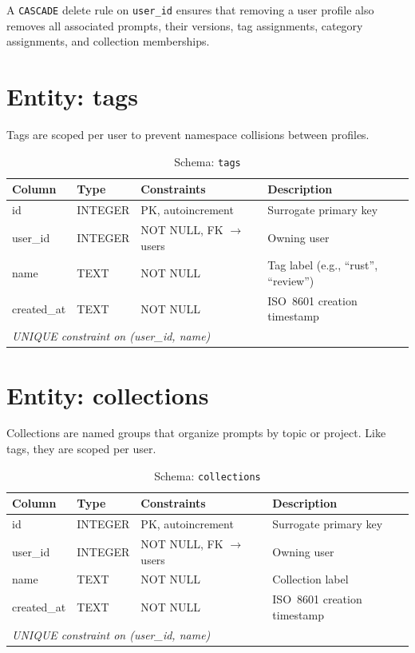 \documentclass[a4paper, 11pt, oneside]{report}
\begin{document}
A \texttt{CASCADE} delete rule on \texttt{user\_id} ensures that removing a
user profile also removes all associated prompts, their versions, tag
assignments, category assignments, and collection memberships.

\section{Entity: tags}
\label{sec:entity-tags}

Tags are scoped per user to prevent namespace collisions between profiles.

\begin{table}[H]
  \centering
  \caption{Schema: \texttt{tags}}
  \label{tab:schema-tags}
  \begin{tabularx}{\textwidth}{l l l X}
    \toprule
    \textbf{Column} & \textbf{Type} & \textbf{Constraints} & \textbf{Description} \\
    \midrule
    id         & INTEGER & PK, autoincrement        & Surrogate primary key \\
    user\_id   & INTEGER & NOT NULL, FK $\to$ users  & Owning user \\
    name       & TEXT    & NOT NULL                  & Tag label (e.g., ``rust'', ``review'') \\
    created\_at& TEXT    & NOT NULL                  & ISO~8601 creation timestamp \\
    \multicolumn{4}{l}{\textit{UNIQUE constraint on (user\_id, name)}} \\
    \bottomrule
  \end{tabularx}
\end{table}

\section{Entity: collections}
\label{sec:entity-collections}

Collections are named groups that organize prompts by topic or project.
Like tags, they are scoped per user.

\begin{table}[H]
  \centering
  \caption{Schema: \texttt{collections}}
  \label{tab:schema-collections}
  \begin{tabularx}{\textwidth}{l l l X}
    \toprule
    \textbf{Column} & \textbf{Type} & \textbf{Constraints} & \textbf{Description} \\
    \midrule
    id         & INTEGER & PK, autoincrement        & Surrogate primary key \\
    user\_id   & INTEGER & NOT NULL, FK $\to$ users  & Owning user \\
    name       & TEXT    & NOT NULL                  & Collection label \\
    created\_at& TEXT    & NOT NULL                  & ISO~8601 creation timestamp \\
    \multicolumn{4}{l}{\textit{UNIQUE constraint on (user\_id, name)}} \\
    \bottomrule
  \end{tabularx}
\end{table}
\end{document}

